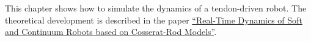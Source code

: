 \documentclass[12pt]{article}
\begin{document}
\makeatletter
\renewcommand{\@maketitle}{
\newpage
\null
\vskip 2em
\begin{center}
{\LARGE \@title \par}
\end{center}
\par
} \makeatother

\maketitle

This chapter shows how to simulate the dynamics of a tendon-driven robot. The theoretical development is described in the paper \href{https://journals.sagepub.com/doi/10.1177/0278364919842269}{``Real-Time Dynamics of Soft and Continuum Robots based on Cosserat-Rod Models''}.
\end{document}

